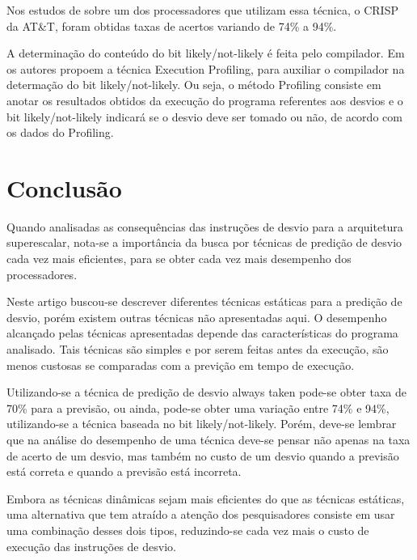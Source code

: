 \documentclass[12pt]{article}
\begin{document}
Nos estudos de \cite{ditzel1987branch} sobre um dos processadores que utilizam essa técnica, o CRISP da AT\&T, foram obtidas taxas de acertos variando de 74\% a 94\%. 

A determinação do conteúdo do bit likely/not-likely é feita pelo compilador. Em \cite{mcfarling1986reducing} os autores propoem a técnica Execution Profiling, para auxiliar o compilador na determação do bit likely/not-likely. Ou seja, o método Profiling consiste em anotar os resultados obtidos da execução do programa referentes aos desvios e o bit likely/not-likely indicará se o desvio deve ser tomado ou não, de acordo com os dados do Profiling.

\section{Conclusão}

Quando analisadas as consequências das instruções de desvio para a arquitetura superescalar, nota-se a importância da busca por técnicas de predição de desvio cada vez mais eficientes, para se obter cada vez mais desempenho dos processadores.

Neste artigo buscou-se descrever diferentes técnicas estáticas para a predição de desvio, porém existem outras técnicas não apresentadas aqui. O desempenho alcançado pelas técnicas apresentadas depende das características do programa analisado. Tais técnicas são simples e por serem feitas antes da execução, são menos custosas se comparadas com a previção em tempo de execução.

Utilizando-se a técnica de predição de desvio always taken pode-se obter taxa de 70\% para a previsão, ou ainda, pode-se obter uma variação entre 74\% e 94\%, utilizando-se a técnica baseada no bit likely/not-likely. Porém, deve-se lembrar que na análise do desempenho de uma técnica deve-se pensar não apenas na taxa de acerto de um desvio, mas também no custo de um desvio quando a previsão está correta e quando a previsão está incorreta.

 Embora  as técnicas dinâmicas sejam mais eficientes do que as técnicas estáticas, uma alternativa que tem atraído a atenção dos pesquisadores consiste em usar uma combinação desses dois tipos, reduzindo-se cada vez mais o custo de execução das instruções de desvio.
 
 \nocite{stallings2010arquitetura}
 \nocite{patterson2014arquitetura}
 \nocite{predicaoTse}


\end{document}
